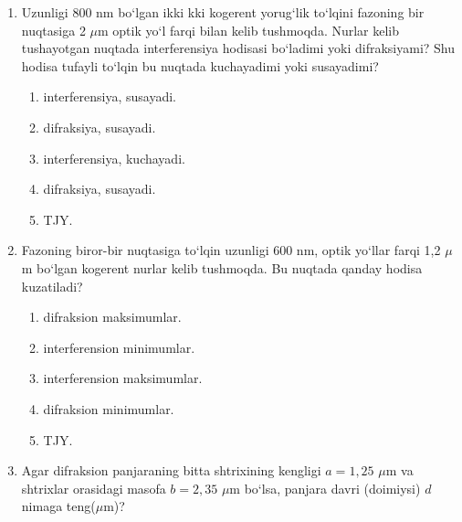 \begin{enumerate}
\item Uzunligi 800 nm bo‘lgan ikki kki kogerent yorug‘lik to‘lqini fazoning bir nuqtasiga 2 $\mu$m optik yo‘l farqi bilan kelib tushmoqda. Nurlar kelib tushayotgan nuqtada interferensiya hodisasi bo‘ladimi yoki difraksiyami? Shu hodisa tufayli to‘lqin bu nuqtada kuchayadimi yoki susayadimi?
\begin{enumerate}[label=\Alph*)]
\item interferensiya, susayadi.
\item difraksiya, susayadi.
\item interferensiya, kuchayadi.
\item difraksiya, susayadi.
\item TJY.
\end{enumerate}

\item Fazoning biror-bir nuqtasiga to‘lqin uzunligi 600 nm, optik yo‘llar farqi 1,2 $\mu$m bo‘lgan kogerent nurlar kelib tushmoqda. Bu nuqtada qanday hodisa kuzatiladi?
\begin{enumerate}[label=\Alph*)]
\item difraksion maksimumlar.
\item interferension minimumlar.
\item interferension maksimumlar.
\item difraksion minimumlar.
\item TJY.
\end{enumerate}

\item Agar difraksion panjaraning bitta shtrixining kengligi $a=1{,}25$ $\mu$m va shtrixlar orasidagi masofa $b=2{,}35$ $\mu$m bo‘lsa, panjara davri (doimiysi) $d$ nimaga teng($\mu$m)?

\end{enumerate}
